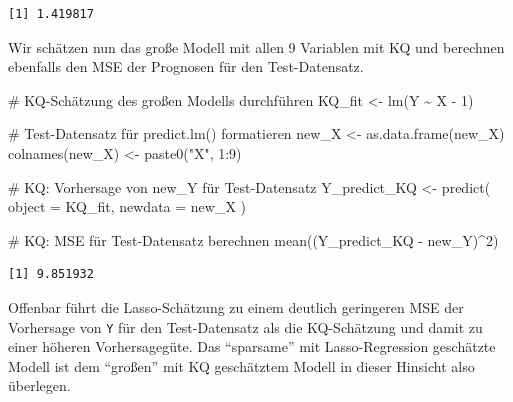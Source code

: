 \documentclass[
  a4paper,
  DIV=11,
  oneside]{scrreprt}
\newenvironment{Shaded}{\begin{snugshade}}{\end{snugshade}}
\newcommand{\AttributeTok}[1]{\textcolor[rgb]{0.40,0.45,0.13}{#1}}
\newcommand{\CommentTok}[1]{\textcolor[rgb]{0.37,0.37,0.37}{#1}}
\newcommand{\DecValTok}[1]{\textcolor[rgb]{0.68,0.00,0.00}{#1}}
\newcommand{\FunctionTok}[1]{\textcolor[rgb]{0.28,0.35,0.67}{#1}}
\newcommand{\NormalTok}[1]{\textcolor[rgb]{0.00,0.23,0.31}{#1}}
\newcommand{\OtherTok}[1]{\textcolor[rgb]{0.00,0.23,0.31}{#1}}
\newcommand{\SpecialCharTok}[1]{\textcolor[rgb]{0.37,0.37,0.37}{#1}}
\newcommand{\StringTok}[1]{\textcolor[rgb]{0.13,0.47,0.30}{#1}}
\begin{document}
\begin{verbatim}
[1] 1.419817
\end{verbatim}

Wir schätzen nun das große Modell mit allen 9 Variablen mit KQ und
berechnen ebenfalls den MSE der Prognosen für den Test-Datensatz.

\begin{Shaded}
\begin{Highlighting}[]
\CommentTok{\# KQ{-}Schätzung des großen Modells durchführen}
\NormalTok{KQ\_fit }\OtherTok{\textless{}{-}} \FunctionTok{lm}\NormalTok{(Y }\SpecialCharTok{\textasciitilde{}}\NormalTok{ X }\SpecialCharTok{{-}} \DecValTok{1}\NormalTok{)}

\CommentTok{\# Test{-}Datensatz für predict.lm() formatieren}
\NormalTok{new\_X }\OtherTok{\textless{}{-}} \FunctionTok{as.data.frame}\NormalTok{(new\_X)}
\FunctionTok{colnames}\NormalTok{(new\_X) }\OtherTok{\textless{}{-}} \FunctionTok{paste0}\NormalTok{(}\StringTok{"X"}\NormalTok{, }\DecValTok{1}\SpecialCharTok{:}\DecValTok{9}\NormalTok{)}

\CommentTok{\# KQ: Vorhersage von new\_Y für Test{-}Datensatz}
\NormalTok{Y\_predict\_KQ }\OtherTok{\textless{}{-}} \FunctionTok{predict}\NormalTok{(}
  \AttributeTok{object =}\NormalTok{ KQ\_fit, }
  \AttributeTok{newdata =}\NormalTok{ new\_X}
\NormalTok{)}

\CommentTok{\# KQ: MSE für Test{-}Datensatz berechnen}
\FunctionTok{mean}\NormalTok{((Y\_predict\_KQ }\SpecialCharTok{{-}}\NormalTok{ new\_Y)}\SpecialCharTok{\^{}}\DecValTok{2}\NormalTok{)}
\end{Highlighting}
\end{Shaded}

\begin{verbatim}
[1] 9.851932
\end{verbatim}

Offenbar führt die Lasso-Schätzung zu einem deutlich geringeren MSE der
Vorhersage von \texttt{Y} für den Test-Datensatz als die KQ-Schätzung
und damit zu einer höheren Vorhersagegüte. Das ``sparsame'' mit
Lasso-Regression geschätzte Modell ist dem ``großen'' mit KQ geschätztem
Modell in dieser Hinsicht also überlegen.
\end{document}
